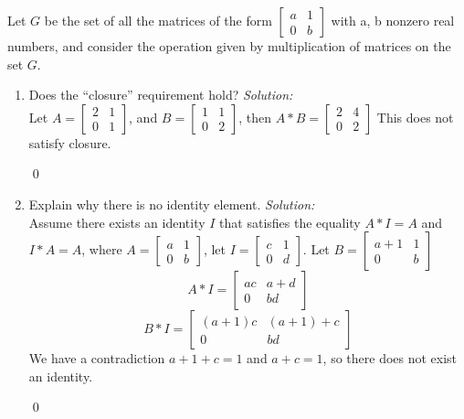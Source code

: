 \documentclass[12 pt]{article}
\newenvironment{problem}[2][Problem]{\begin{trivlist}
\item[\hskip \labelsep {\bfseries #1}\hskip \labelsep {\bfseries #2.}]}{\end{trivlist}}
\newenvironment{sol}
    {\emph{Solution:}
    }
    {
    \qed
    }
\theoremstyle{definition}
\begin{document}
\begin{problem}{4}
Let $G$ be the set of all the matrices of the form $\begin{bmatrix}a&1\\ 0& b\end{bmatrix}$
with a, b
nonzero real numbers, and consider the operation given by multiplication of matrices on the set $G$.
\begin{enumerate}
    \item Does the “closure” requirement hold? \begin{sol}\\
    Let $A = \begin{bmatrix}
    2 & 1\\0 & 1
    \end{bmatrix}$, and $B=\begin{bmatrix}
    1 & 1\\0 & 2
    \end{bmatrix}$, then $A*B = \begin{bmatrix}
    2 & 4\\
    0 & 2
    \end{bmatrix}
    $
    This does not satisfy closure.
    \end{sol}
    \item  Explain why there is no identity element.
    \begin{sol}\\
    Assume there exists an identity $I$ that satisfies the equality $A*I=A$ and $I*A=A$, where $A=\begin{bmatrix}
    a&1\\0&b
    \end{bmatrix}$, let $I=\begin{bmatrix}c&1\\0&d\end{bmatrix}$. Let $B=\begin{bmatrix}a+1 & 1 \\ 0 & b\end{bmatrix}$\\
    \[A*I=\begin{bmatrix} ac & a + d\\
    0 & bd\end{bmatrix}\]
    \[B*I=\begin{bmatrix} (a+1)c & (a+1)+c\\
    0 & bd\end{bmatrix}\]
    We have a contradiction $a+1 + c = 1$ and $a + c = 1$, so there does not exist an identity.
    \end{sol}

\end{enumerate}
\end{problem}
\end{document}
